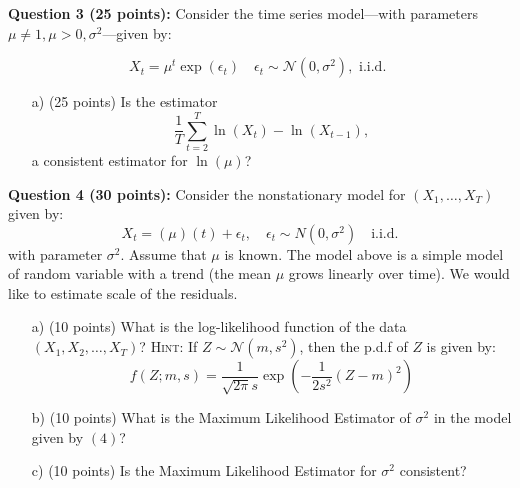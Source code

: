 \documentclass[12] {article}
\begin{document}
\noindent \textbf{Question 3 (25 points):} Consider the time series model---with parameters $\mu \neq 1, \mu>0, \sigma^2$---given by:

\begin{equation}
X_t = \mu^t \exp(\epsilon_t) \quad \epsilon_{t} \sim \mathcal{N}(0,\sigma^2), \textrm{ i.i.d. }
\end{equation}

\begin{itemize}
\item [a)] (25 points) Is the estimator 
\[ \frac{1}{T} \sum_{t=2}^{T} \ln (X_{t}) - \ln (X_{t-1}), \]
a consistent estimator for $\ln(\mu)$?

\end{itemize}


\noindent \textbf{Question 4 (30 points):} Consider the nonstationary model for $(X_1, \ldots, X_{T})$ given by:
\begin{equation}
X_t = (\mu) (t) + \epsilon_t, \quad \epsilon_t \sim N(0,\sigma^2) \quad \textrm{i.i.d.}
\end{equation}
with parameter $\sigma^2$. Assume that $\mu$ is known. The model above is a simple model of random variable with a trend (the mean $\mu$ grows linearly over time). We would like to estimate scale of the residuals. 

\begin{itemize}
\item [a)] (10 points) What is the log-likelihood function of the data $(X_1, X_2, \ldots, X_{T})$? {\scshape Hint:} If $Z \sim \mathcal{N}(m, s^2)$, then the p.d.f of $Z$ is given by:
$$ f(Z; m, s) = \frac{1}{\sqrt{2\pi} s } \exp \left( -\frac{1}{2 s^2} (Z-m)^2 \right)  $$
 
 \item [b)] (10 points) What is the Maximum Likelihood Estimator of $\sigma^2$ in the model given by $(4)$? \\
 
 \item [c)] (10 points) Is the Maximum Likelihood Estimator for $\sigma^2$ consistent? 
  
\end{itemize}



 
\end{document}
